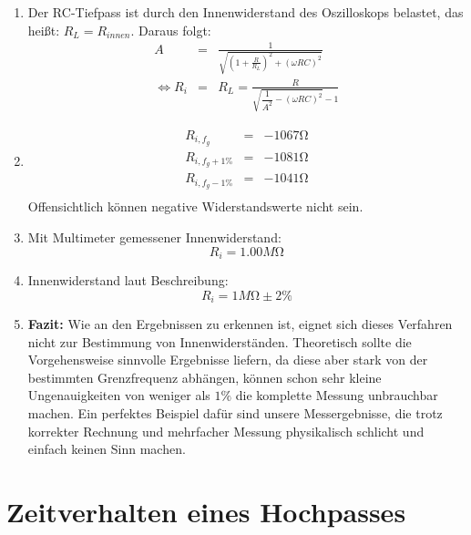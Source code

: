 \documentclass[10pt]{scrreprt}
\begin{document}
\begin{enumerate}
        \item
            Der RC-Tiefpass ist durch den Innenwiderstand des Oszilloskops
            belastet, das heißt: $R_L = R_{innen}$. Daraus folgt:
            \begin{eqnarray*}
                A &=& \frac{1}{\sqrt{{\left(1+\frac{R}{R_L}\right)}^2 + {(\omega R C)}^2}}\\
                \Leftrightarrow
                R_i &=& R_L = \frac{R}{\sqrt{\dfrac{1}{A^2} -{(\omega R C)}^2} - 1}
            \end{eqnarray*}
        \item
            \begin{eqnarray*}
                R_{i,f_g} &=& -1067\si{\ohm}\\
                R_{i,f_g+1\%} &=& -1081\si{\ohm}\\
                R_{i,f_g-1\%} &=& -1041\si{\ohm}\\
            \end{eqnarray*}
            Offensichtlich können negative Widerstandswerte nicht sein.
        \item
            Mit Multimeter gemessener Innenwiderstand:
            \begin{equation*}
                R_i = 1.00\si{M\ohm}
            \end{equation*}
        \item
            Innenwiderstand laut Beschreibung:
            \begin{equation*}
                R_i = 1 \si{M\ohm} \pm 2\%
            \end{equation*}
        \item \textbf{Fazit:}
            Wie an den Ergebnissen zu erkennen ist, eignet sich dieses Verfahren
            nicht zur Bestimmung von Innenwiderständen. Theoretisch sollte die
            Vorgehensweise sinnvolle Ergebnisse liefern, da diese aber stark von
            der bestimmten Grenzfrequenz abhängen, können schon sehr kleine
            Ungenauigkeiten von weniger als $1\%$ die komplette Messung unbrauchbar
            machen. Ein perfektes Beispiel dafür sind unsere Messergebnisse, die
            trotz korrekter Rechnung und mehrfacher Messung physikalisch schlicht
            und einfach keinen Sinn machen.
    \end{enumerate}

    \section{Zeitverhalten eines Hochpasses}
\end{document}
